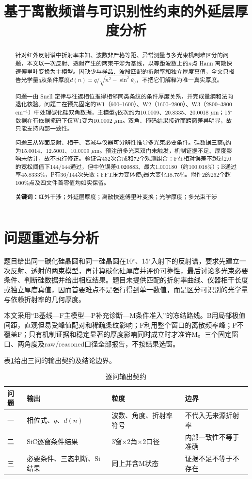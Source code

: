 \documentclass[UTF8,12pt,a4paper]{ctexart}
\title{基于离散频谱与可识别性约束的外延层厚度分析}\author{}\date{}
\newcommand{\keywords}[1]{\par\vspace{.5em}\noindent\textbf{关键词：}#1}
\begin{document}
\maketitle\vspace{-2.5em}
\begin{abstract}
针对红外反射谱中折射率未知、波数非严格等距、异常测量与多光束机制难区分的问题，本文以一次反射、透射产生的两束干涉为基线，以等距波数上的$n$点 Hann 离散快速傅里叶变换为主模型。因缺少与样品、波段匹配的折射率和独立厚度真值，全文只报告光学量$q$及条件厚度$d(n)=q/\sqrt{n^2-\sin^2\theta_0}$，不把它们解释为唯一真实厚度。

问题一由 Snell 定律与往返相位推得相邻同类条纹的条件厚度关系，并完成量纲和法向退化核验。问题二在预先固定的W1（600--1600）、W2（1600--2800）、W3（2800--3800 cm$^{-1}$）中处理碳化硅双角数据，主模型$q$依次约为10.0009、20.8335、20.0018 $\mu$m；15$^\circ$数据在有依据掩码下仅W1变为10.0002 $\mu$m。双角、掩码结果接近而跨窗差异明显，故只能支持内部一致性。

问题三从界面反射、相干、衰减与仪器可分辨性推导多光束必要条件。硅数据三窗$q$约为15.0014、12.5001、10.0009 $\mu$m。预注册多光束双门未触发，机制证据不足、厚度影响未估计，故不执行修正。验证含432次合成和72个观测组合：F在相对误差不超过2.0的宽松阈值下144/144通过，但中位误差0.020883、最大1.000180（约100.018\%）；B通过率45.8333\%，P有36/144次失败；FFT压力变体使$q$最大变化18.75\%。附件2的262个超100\%点及四文件首零值均如实保留。
\keywords{红外干涉；外延层厚度；离散快速傅里叶变换；光学厚度；多光束干涉}
\end{abstract}\clearpage

\section{问题重述与分析}
题目给出同一碳化硅晶圆和同一硅晶圆在10$^\circ$、15$^\circ$入射下的反射谱，要求先建立一次反射、透射的两束模型，再计算碳化硅厚度并评价可靠性，最后讨论多光束必要条件、判断硅数据并给出相应结果。题目未提供匹配的折射率曲线、仪器相干长度或独立厚度真值，因而首要难点不是强行得到单一数值，而是区分可识别的光学量与依赖折射率的几何厚度。

本文采用“B基线---F主模型---P补充诊断---M条件准入”的冻结路线。B用局部极值间距，直观但易受峰值配对和稀疏条纹影响；F利用整个窗口的离散频率峰；P不覆盖F；只有机制证据和稳定显著的厚度影响同时成立时才准许M。三个固定窗口、两角度及raw/reasoned口径全部报告，不按结果选窗。

表\ref{tab:contract}给出三问的输出契约及结论边界。

\begin{table}[H]\centering\small
\caption{逐问输出契约}\label{tab:contract}
\begin{tabular}{p{1.2cm}p{4.2cm}p{4.5cm}p{4.2cm}}\toprule
问题&输出&粒度&边界\\\midrule
一&相位式、$q$、$d(n)$&波数、角度、折射率符号&不代入无来源折射率\\
二&SiC逐窗条件结果&3窗$\times$2角$\times$2口径&内部一致性不等于准确\\
三&必要条件、三态判断、Si结果&同上并含M状态&证据不足不等于不存在\\\bottomrule
\end{tabular}\end{table}
\end{document}
